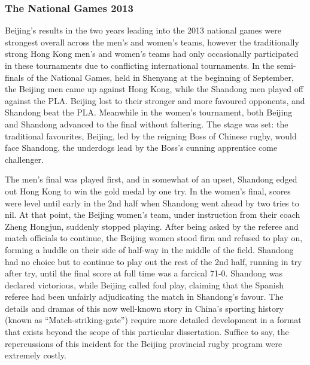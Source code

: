 \begin{CJK}{UTF8}{gbsn}
\subsubsection{The National Games 2013 \label{sect:fallFromGrace}}
Beijing's results in the two years leading into the 2013 national games were strongest overall across the men's and women's teams, however the traditionally strong Hong Kong men's and women's teams had only occasionally participated in these tournaments due to conflicting international tournaments.  In the semi-finals of the National Games, held in Shenyang at the beginning of September, the Beijing men came up against Hong Kong, while the Shandong men played off against the PLA.  Beijing lost to their stronger and more favoured opponents, and Shandong beat the PLA.  Meanwhile in the women's tournament, both Beijing and Shandong advanced to the final without faltering.  The stage was set: the traditional favourites, Beijing, led by the reigning Boss of Chinese rugby, would face Shandong, the underdogs lead by the Boss's cunning apprentice come challenger.

The men's final was played first, and in somewhat of an upset, Shandong edged out Hong Kong to win the gold medal by one try.  In the women's final, scores were level until early in the 2nd half when Shandong went ahead by two tries to nil.  At that point, the Beijing women's team, under instruction from their coach Zheng Hongjun, suddenly stopped playing.  After being asked by the referee and match officials to continue, the Beijing women stood firm and refused to play on, forming a huddle on their side of half-way in the middle of the field. Shandong had no choice but to continue to play out the rest of the 2nd half, running in try after try, until the final score at full time was a farcical 71-0.  Shandong was declared victorious, while Beijing called foul play, claiming that the Spanish referee had been unfairly adjudicating the match in Shandong's favour.  The details and dramas of this now well-known story in China's sporting history (known as ``Match-striking-gate'') require more detailed development in a format that exists beyond the scope of this particular dissertation. Suffice to say, the repercussions of this incident for the Beijing provincial rugby program were extremely costly.





\end{CJK}
